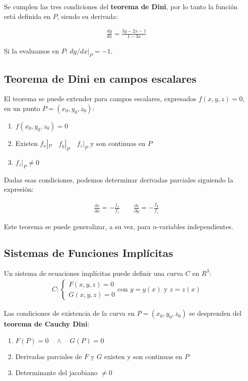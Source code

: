 Se cumplen las tres condiciones del \textbf{teorema de Dini},
por lo tanto la función está definida en \(P\),
siendo su derivada:

\begin{align*}
    \frac{dy}{dx} = \frac{3y - 2x - 1}{1 - 3x}
\end{align*}

Si la evaluamos en \(P\): \(dy/dx|_P = -1\).

\subsection{Teorema de Dini en campos escalares}

El teorema se puede extender para campos escalares,
expresados \(f(x,y,z) = 0\),
en un punto \(P= (x_0,y_0,z_0)\):
\begin{enumerate}
    \item \(f(x_0,y_0,z_0) = 0\)
    \item Existen \(f_x|_P \quad f_y|_P \quad f_z|_P\) y son continuas en \(P\)
    \item \(f_z|_P \neq 0\)
\end{enumerate}

Dadas esas condiciones,
podemos determinar derivadas parciales siguiendo la expresión:

\begin{align*}
    \frac{\partial z}{\partial x} = -\frac{f_x}{f_z} \qquad
    \frac{\partial z}{\partial y} = -\frac{f_y}{f_z}
\end{align*}

Este teorema se puede generalizar,
a su vez,
para \(n\)-variables independientes.

\subsection{Sistemas de Funciones Implícitas}

Un sistema de ecuaciones implícitas puede definir una curva \(C\) en \(R^{3}\):
\begin{align*} C:
    \begin{cases}
        F(x,y,z)=0 \\
        G(x,y,z)=0
    \end{cases}
    \text{con } y = y(x) \text{ y } z = z(x)
\end{align*}

Las condiciones de existencia de la curva en \(P=(x_0,y_0,z_0)\) se desprenden del
\textbf{teorema de Cauchy Dini}:
\begin{enumerate}
    \item \(F(P) = 0 \quad \land \quad G(P) = 0\)
    \item Derivadas parciales de \(F\) y \(G\) existen y son continuas en \(P\)
    \item Determinante del jacobiano \(\neq 0\)
\end{enumerate}


